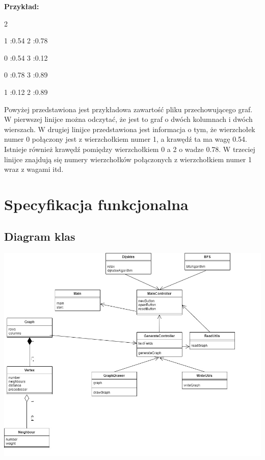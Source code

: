 \documentclass[11pt,a4paper]{report}
\newenvironment{multiconsole}{\begingroup\fontfamily{qcr}\selectfont}{\endgroup}
\begin{document}
    \vspace{1em}

    \noindent
    \textbf{Przykład:}

    \begin{multiconsole}
        2 2

        \hspace*{2em}1 :0.54  2 :0.78

        \hspace*{2em}0 :0.54  3 :0.12

        \hspace*{2em}0 :0.78  3 :0.89

        \hspace*{2em}1 :0.12  2 :0.89
    \end{multiconsole}

    Powyżej przedstawiona jest przykładowa zawartość pliku przechowującego graf. W pierwszej linijce można odczytać, że jest to graf o dwóch kolumnach i dwóch wierszach. W drugiej linijce przedstawiona jest informacja o tym, że wierzchołek numer 0 połączony jest z wierzchołkiem numer 1, a krawędź ta ma wagę 0.54. Istnieje również krawędź pomiędzy wierzchołkiem 0 a 2 o wadze 0.78. W trzeciej linijce znajdują się numery wierzchołków połączonych z wierzchołkiem numer 1 wraz z wagami itd.





    \newpage
    \chapter{Specyfikacja funkcjonalna}

    \newpage
    \section{Diagram klas}

    \includegraphics[width=\textwidth]{diagram.png}
\end{document}

